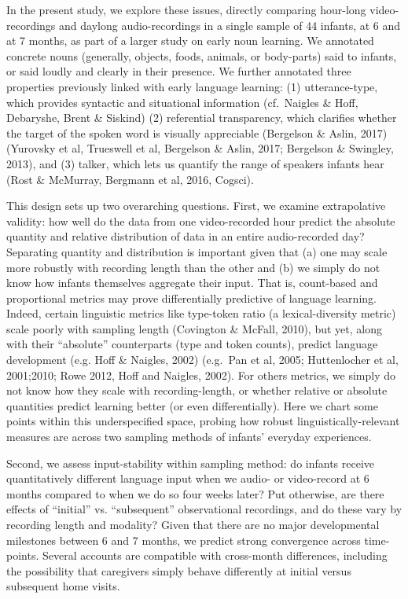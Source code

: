 \documentclass[floatsintext,man]{apa6}
\theoremstyle{definition}
\theoremstyle{definition}
\theoremstyle{definition}
\theoremstyle{remark}
\begin{document}
In the present study, we explore these issues, directly comparing
hour-long video-recordings and daylong audio-recordings in a single
sample of 44 infants, at 6 and at 7 months, as part of a larger study on
early noun learning. We annotated concrete nouns (generally, objects,
foods, animals, or body-parts) said to infants, or said loudly and
clearly in their presence. We further annotated three properties
previously linked with early language learning: (1) utterance-type,
which provides syntactic and situational information (cf.~Naigles \&
Hoff, Debaryshe, Brent \& Siskind) (2) referential transparency, which
clarifies whether the target of the spoken word is visually appreciable
(Bergelson \& Aslin, 2017) (Yurovsky et al, Trueswell et al, Bergelson
\& Aslin, 2017; Bergelson \& Swingley, 2013), and (3) talker, which lets
us quantify the range of speakers infants hear (Rost \& McMurray,
Bergmann et al, 2016, Cogsci).

This design sets up two overarching questions. First, we examine
extrapolative validity: how well do the data from one video-recorded
hour predict the absolute quantity and relative distribution of data in
an entire audio-recorded day? Separating quantity and distribution is
important given that (a) one may scale more robustly with recording
length than the other and (b) we simply do not know how infants
themselves aggregate their input. That is, count-based and proportional
metrics may prove differentially predictive of language learning.
Indeed, certain linguistic metrics like type-token ratio (a
lexical-diversity metric) scale poorly with sampling length (Covington
\& McFall, 2010), but yet, along with their \enquote{absolute}
counterparts (type and token counts), predict language development (e.g.
Hoff \& Naigles, 2002) (e.g.~Pan et al, 2005; Huttenlocher et al,
2001;2010; Rowe 2012, Hoff and Naigles, 2002). For others metrics, we
simply do not know how they scale with recording-length, or whether
relative or absolute quantities predict learning better (or even
differentially). Here we chart some points within this underspecified
space, probing how robust linguistically-relevant measures are across
two sampling methods of infants' everyday experiences.

Second, we assess input-stability within sampling method: do infants
receive quantitatively different language input when we audio- or
video-record at 6 months compared to when we do so four weeks later? Put
otherwise, are there effects of \enquote{initial} vs.
\enquote{subsequent} observational recordings, and do these vary by
recording length and modality? Given that there are no major
developmental milestones between 6 and 7 months, we predict strong
convergence across time-points. Several accounts are compatible with
cross-month differences, including the possibility that caregivers
simply behave differently at initial versus subsequent home visits.
\end{document}
